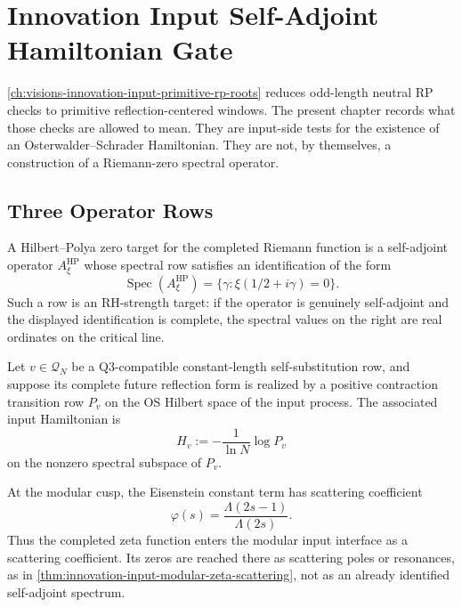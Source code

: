 \chapter{Innovation Input Self-Adjoint Hamiltonian Gate}
\label{ch:visions-innovation-input-self-adjoint-hamiltonian-gate}

\autoref{ch:visions-innovation-input-primitive-rp-roots} reduces odd-length
neutral RP checks to primitive reflection-centered windows. The present
chapter records what those checks are allowed to mean. They are input-side
tests for the existence of an Osterwalder--Schrader Hamiltonian. They are
not, by themselves, a construction of a Riemann-zero spectral operator.

\section{Three Operator Rows}
\label{sec:innovation-input-three-operator-rows}

\begin{definition}
\label{def:innovation-input-hilbert-polya-zero-target}
A Hilbert--Polya zero target for the completed Riemann function is a
self-adjoint operator $A_{\xi}^{\mathrm{HP}}$ whose spectral row satisfies
an identification of the form
$$
\operatorname{Spec}(A_{\xi}^{\mathrm{HP}})
=
\{\gamma:\xi(1/2+i\gamma)=0\}.
$$
Such a row is an RH-strength target: if the operator is genuinely
self-adjoint and the displayed identification is complete, the spectral
values on the right are real ordinates on the critical line.
\end{definition}

\begin{definition}
\label{def:innovation-input-os-rp-hamiltonian}
Let $v\in\mathcal Q_N$ be a Q3-compatible constant-length
self-substitution row, and suppose its complete future reflection form is
realized by a positive contraction transition row $P_v$ on the OS Hilbert
space of the input process. The associated input Hamiltonian is
$$
H_v:=-\frac1{\ln N}\log P_v
$$
on the nonzero spectral subspace of $P_v$.
\end{definition}

\begin{definition}
\label{def:innovation-input-riemann-scattering-row}
At the modular cusp, the Eisenstein constant term has scattering
coefficient
$$
\varphi(s)=\frac{\Lambda(2s-1)}{\Lambda(2s)}.
$$
Thus the completed zeta function enters the modular input interface as a
scattering coefficient. Its zeros are reached there as scattering poles or
resonances, as in
\autoref{thm:innovation-input-modular-zeta-scattering}, not as an already
identified self-adjoint spectrum.
\end{definition}

